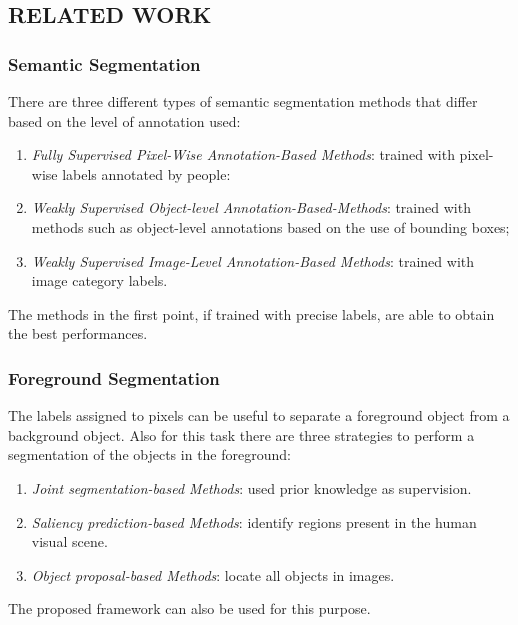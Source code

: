 \subsection{RELATED WORK}
\subsubsection{Semantic Segmentation}
There are three different types of semantic segmentation methods that differ 
based on the level of annotation used:
\begin{enumerate}
    \item \emph{Fully Supervised Pixel-Wise Annotation-Based Methods}: trained with 
    pixel-wise labels annotated by people:
    \item \emph{Weakly Supervised Object-level Annotation-Based-Methods}: trained with 
    methods such as object-level annotations based on the use of bounding 
    boxes;
    \item \emph{Weakly Supervised Image-Level Annotation-Based Methods}: trained 
    with image category labels.
\end{enumerate}
The methods in the first point, if trained with precise labels, are able to 
obtain the best performances.

\subsubsection{Foreground Segmentation}
The labels assigned to pixels can be useful to separate a foreground object from a background object. Also for this task there are three strategies to perform a segmentation of the objects in the foreground:
\begin{enumerate}
    \item \emph{Joint segmentation-based Methods}: used prior knowledge as supervision.
    \item \emph{Saliency prediction-based Methods}: identify regions present in the human visual scene.
    \item \emph{Object proposal-based Methods}: locate all objects in images.
\end{enumerate}
The proposed framework can also be used for this purpose.